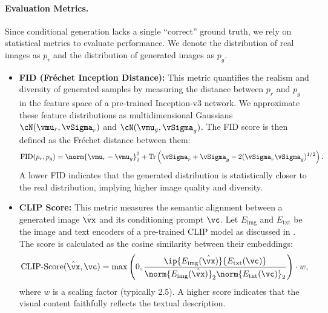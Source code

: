 \documentclass[../../book-main.tex]{subfiles}
\begin{document}
\paragraph{Evaluation Metrics.}
Since conditional generation lacks a single ``correct'' ground truth, we rely on statistical metrics to evaluate performance.
We denote the distribution of real images as \(p_{r}\) and the distribution of generated images as \(p_{g}\).
\begin{itemize}
    \item \textbf{FID (Fréchet Inception Distance):} This metric quantifies the realism and diversity of generated samples by measuring the distance between \(p_{r}\) and \(p_{g}\) in the feature space of a pre-trained Inception-v3 network.
We approximate these feature distributions as multidimensional Gaussians \(\cN(\vmu_{r}, \vSigma_{r})\) and \(\cN(\vmu_{g}, \vSigma_{g})\).
The FID score is then defined as the Fréchet distance between them:
    \begin{equation}
        \text{FID}(p_{r}, p_{g}) = \norm{\vmu_{r} - \vmu_{g}}_{2}^{2} + \operatorname{Tr}\left( \vSigma_{r} + \vSigma_{g} - 2(\vSigma_{r} \vSigma_{g})^{1/2} \right) .
    \end{equation}
    A lower FID indicates that the generated distribution is statistically closer to the real distribution, implying higher image quality and diversity.
    \item \textbf{CLIP Score:} This metric measures the semantic alignment between a generated image \(\hat{\vx}\) and its conditioning prompt \(\vc\).
Let \(E_{\text{img}}\) and \(E_{\text{txt}}\) be the image and text encoders of a pre-trained CLIP model as discussed in .
The score is calculated as the cosine similarity between their embeddings:
    \begin{equation}
        \text{CLIP-Score}(\hat{\vx}, \vc) = \max \left( 0, \frac{\ip{E_{\text{img}}(\hat{\vx})}{E_{\text{txt}}(\vc)}}{\norm{E_{\text{img}}(\hat{\vx})}_{2} \norm{E_{\text{txt}}(\vc)}_{2}} \right) \cdot w ,
    \end{equation}
    where \(w\) is a scaling factor (typically 2.5).
A higher score indicates that the visual content faithfully reflects the textual description.
\end{itemize}
\end{document}
